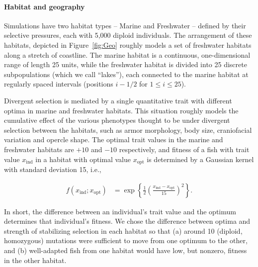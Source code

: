 \documentclass{article}
\begin{document}
\paragraph{Habitat and geography}

Simulations have two habitat types -- Marine and Freshwater -- defined by their selective pressures, each with 5,000 diploid individuals. The arrangement of these habitats, depicted in Figure~\ref{fig:Geo} roughly models a set of freshwater habitats along a stretch of coastline. The marine habitat is a continuous, one-dimensional range of length 25 units, while the freshwater habitat is divided into 25 discrete subpopulations (which we call ``lakes''), each connected to the marine habitat at regularly spaced intervals (positions $i - 1/2$ for $1 \le i \le 25$).

Divergent selection is mediated by a single quantitative trait with different optima in marine and freshwater habitats. This situation roughly models the cumulative effect of the various phenotypes thought to be under divergent selection between the habitats, such as armor morphology, body size, craniofacial variation and opercle shape. The optimal trait values in the marine and freshwater habitats are $+10$ and $-10$ respectively, and fitness of a fish with trait value $x_\text{ind}$ in a habitat with optimal value $x_\text{opt}$ is determined by a Gaussian kernel with standard deviation 15, i.e.,

\begin{align*}
    f(x_\text{ind}; x_\text{opt})
    &=
    \exp\left\{
        \frac{1}{2}
            \left(
            \frac{x_\text{ind}-x_\text{opt}}{15}
            \right)^2
        \right\} .
\end{align*}

In short, the difference between an individual's trait value and the optimum determines that individual's fitness. We chose the difference between optima and strength of stabilizing selection in each habitat so that (a) around 10 (diploid, homozygous) mutations were sufficient to move from one optimum to the other, and (b) well-adapted fish from one habitat would have low, but nonzero, fitness in the other habitat.
\end{document}
